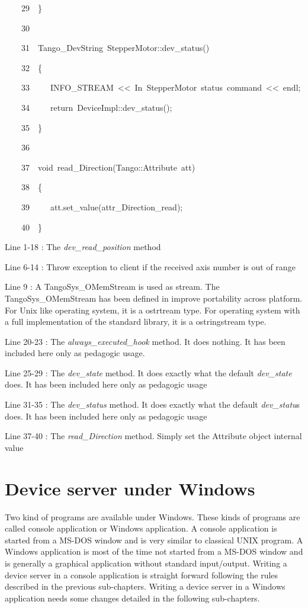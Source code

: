 \begin{lyxcode}
~~~~29~~\}

~~~~30~~

~~~~31~~Tango\_DevString~StepperMotor::dev\_status()

~~~~32~~\{

~~~~33~~~~~INFO\_STREAM~<\textcompwordmark{}<~\textquotedbl{}In~StepperMotor~status~command\textquotedbl{}~<\textcompwordmark{}<~endl;

~~~~34~~~~~return~DeviceImpl::dev\_status();

~~~~35~~\}

~~~~36~~

~~~~37~~void~read\_Direction(Tango::Attribute~att)

~~~~38~~\{

~~~~39~~~~~att.set\_value(attr\_Direction\_read);

~~~~40~~\}
\end{lyxcode}


Line 1-18 : The \emph{dev\_read\_position} method

Line 6-14 : Throw exception to client if the received axis number
is out of range

Line 9 : A TangoSys\_OMemStream is used as stream. The TangoSys\_OMemStream
has been defined in improve portability across platform. For Unix
like operating system, it is a ostrtream type. For operating system
with a full implementation of the standard library, it is a ostringstream
type.

Line 20-23 : The \emph{always\_executed\_hook} method. It does nothing.
It has been included here only as pedagogic usage.

Line 25-29 : The \emph{dev\_state} method. It does exactly what the
default \emph{dev\_state} does. It has been included here only as
pedagogic usage

Line 31-35 : The \emph{dev\_status} method. It does exactly what the
default \emph{dev\_statu}s does. It has been included here only as
pedagogic usage

Line 37-40 : The \emph{read\_Direction} method. Simply set the Attribute
object internal value


\section{Device server under Windows}

Two kind of programs are available under Windows.
These kinds of programs are called console application
or Windows application. A console application is started from a MS-DOS
window and is very similar to classical UNIX program. A Windows application
is most of the time not started from a MS-DOS window and is generally
a graphical application without standard input/output. Writing a device
server in a console application is straight forward following the
rules described in the previous sub-chapters. Writing a device server
in a Windows application needs some changes detailed in the following
sub-chapters.


